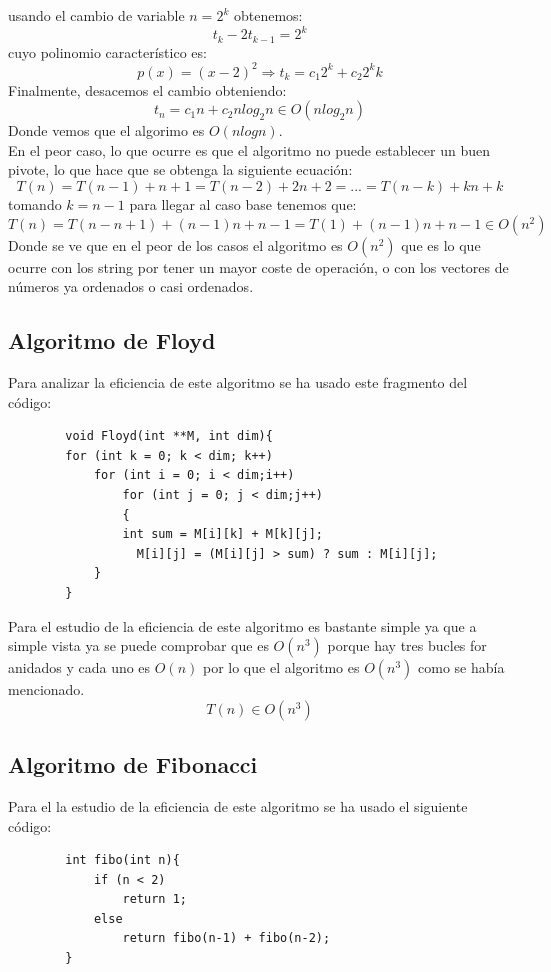 \documentclass[11pt]{article}
\begin{document}
        usando el cambio de variable $n=2^k$ obtenemos:
        \begin{equation*}
            t_k - 2t_{k-1} = 2^k 
        \end{equation*}
        cuyo polinomio característico es: $$p(x)=(x-2)^2 \Rightarrow t_k=c_1 2^k + c_2 2^k k$$
        Finalmente, desacemos el cambio obteniendo: 
        \begin{equation*}
            t_n = c_1 n + c_2 n log_2 n \in O(nlog_2 n)
        \end{equation*}
        Donde vemos que el algorimo es $O(nlog n)$.\\
        En el peor caso, lo que ocurre es que el algoritmo no puede establecer un buen pivote, lo que hace que se obtenga la siguiente
        ecuación:
        \begin{equation*}
            T(n)=T(n-1)+n+1= T(n-2)+2n+2=...=T(n-k)+kn+k
        \end{equation*}
        tomando $k=n-1$ para llegar al caso base tenemos que:
        \begin{equation*}
            T(n)=T(n-n+1)+(n-1)n+n-1=T(1)+(n-1)n+n-1 \in O(n^2)
        \end{equation*}
        Donde se ve que en el peor de los casos el algoritmo es $O(n^2)$ que es lo que ocurre con los string por tener un mayor coste de 
        operación, o con los vectores de números ya ordenados o casi ordenados.

        \subsection*{Algoritmo de Floyd}
        Para analizar la eficiencia de este algoritmo se ha usado este fragmento del código:
        \begin{lstlisting}
        void Floyd(int **M, int dim){
        for (int k = 0; k < dim; k++)
            for (int i = 0; i < dim;i++)
                for (int j = 0; j < dim;j++)
                {
                int sum = M[i][k] + M[k][j];    	
                  M[i][j] = (M[i][j] > sum) ? sum : M[i][j];
            }
        }	     	
        \end{lstlisting}
        Para el estudio de la eficiencia de este algoritmo es bastante simple ya que a simple vista ya se puede comprobar que es $O(n^3)$ porque hay 
        tres bucles for anidados y cada uno es $O(n)$ por lo que el algoritmo es $O(n^3)$ como se había mencionado.
        $$T(n) \in O(n^3)$$

        \subsection*{Algoritmo de Fibonacci}
        Para el la estudio de la eficiencia de este algoritmo se ha usado el siguiente código:
        \begin{lstlisting}
        int fibo(int n){
            if (n < 2)
                return 1;
            else
                return fibo(n-1) + fibo(n-2);
        }
            
        \end{lstlisting}
\end{document}
